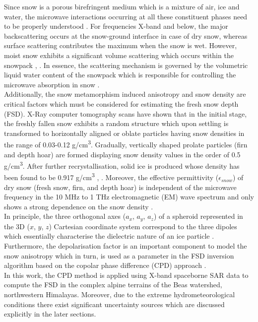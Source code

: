 \documentclass{article}
\begin{document}
Since snow is a porous birefringent medium which is a mixture of air, ice and water, the microwave interactions occurring at all these constituent phases need to be properly understood \cite{Leinss2014}. For frequencies X-band and below, the major backscattering occurs at the snow-ground interface in case of dry snow, whereas surface scattering contributes the maximum when the snow is wet. However, moist snow exhibits a significant volume scattering which occurs within the snowpack \cite{Thakur2012}, \cite{Leinss2014}. In essence, the scattering mechanism is governed by the volumetric liquid water content of the snowpack which is responsible for controlling the microwave absorption in snow \cite{Leinss2014}.\\
\indent Additionally, the snow metamorphism induced anisotropy and snow density are critical factors which must be considered for estimating the fresh snow depth (FSD). X-Ray computer tomography scans \cite{Riche2013} have shown that in the initial stage, the freshly fallen snow exhibits a random structure which upon settling is transformed to horizontally aligned or oblate particles having snow densities in the range of 0.03-0.12 g/cm\textsuperscript{3}. Gradually, vertically shaped prolate particles (firn and depth hoar) are formed displaying snow density values in the order of 0.5 g/cm\textsuperscript{3}. After further recrystallisation, solid ice is produced whose density has been found to be 0.917 g/cm\textsuperscript{3} \cite{Leinss2014}, \cite{Riche2013}. Moreover, the effective permittivity ($\epsilon_{snow}$) of dry snow (fresh snow, firn, and depth hoar) is independent of the microwave frequency in the 10 MHz to 1 THz electromagnetic (EM) wave spectrum and only shows a strong dependence on the snow density \cite{Leinss2014}.\\
\indent In principle, the three orthogonal axes ($a_x$, $a_y$, $a_z$) of a spheroid represented in the 3D ($x$, $y$, $z$) Cartesian coordinate system correspond to the three dipoles which essentially characterise the dielectric nature of an ice particle \cite[Fig. 6]{Leinss2014}. Furthermore, the depolarisation factor is an important component to model the snow anisotropy which in turn, is used as a parameter in the FSD inversion algorithm based on the copolar phase difference (CPD) approach \cite{Leinss2014}.\\
\indent In this work, the CPD method is applied using X-band spaceborne SAR data to compute the FSD in the complex alpine terrains of the Beas watershed, northwestern Himalayas. Moreover, due to the extreme hydrometeorological conditions there exist significant uncertainty sources which are discussed explicitly in the later sections.
\end{document}
